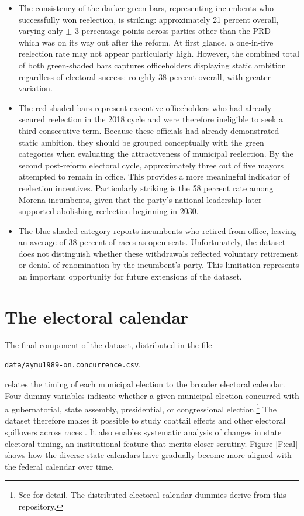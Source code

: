 \documentclass[letter,12pt]{article}
\begin{document}
\begin{itemize}
\item The consistency of the darker green bars, representing incumbents who successfully won reelection, is striking: approximately 21 percent overall, varying only $\pm$ 3 percentage points across parties other than the PRD---which was on its way out after the reform. At first glance, a one-in-five reelection rate may not appear particularly high. However, the combined total of both green-shaded bars captures officeholders displaying static ambition regardless of electoral success: roughly 38 percent overall, with greater variation.
\item The red-shaded bars represent executive officeholders who had already secured reelection in the 2018 cycle and were therefore ineligible to seek a third consecutive term. Because these officials had already demonstrated static ambition, they should be grouped conceptually with the green categories when evaluating the attractiveness of municipal reelection. By the second post-reform electoral cycle, approximately three out of five mayors attempted to remain in office. This provides a more meaningful indicator of reelection incentives. Particularly striking is the 58 percent rate among Morena incumbents, given that the party's national leadership later supported abolishing reelection beginning in 2030. 
\item The blue-shaded category reports incumbents who retired from office, leaving an average of 38 percent of races as open seats. Unfortunately, the dataset does not distinguish whether these withdrawals reflected voluntary retirement or denial of renomination by the incumbent's party. This limitation represents an important opportunity for future extensions of the dataset.
\end{itemize}
  
\section{The electoral calendar}\label{S:cal}

The final component of the dataset, distributed in the file

\begin{center}
  \verb|data/aymu1989-on.concurrence.csv|,
\end{center}

\noindent relates the timing of each municipal election to the broader electoral calendar. Four dummy variables indicate whether a given municipal election concurred with a gubernatorial, state assembly, presidential, or congressional election.\footnote{See \citet{magarInstReel.2017} for detail. The distributed electoral calendar dummies derive from this repository.} The dataset therefore makes it possible to study coattail effects and other electoral spillovers across races \citep[e.g.,][]{magar.gubCoatMx.2012, ames.1994}. It also enables systematic analysis of changes in state electoral timing, an institutional feature that merits closer scrutiny. Figure \ref{F:cal} shows how the diverse state calendars have gradually become more aligned with the federal calendar over time.
\end{document}
